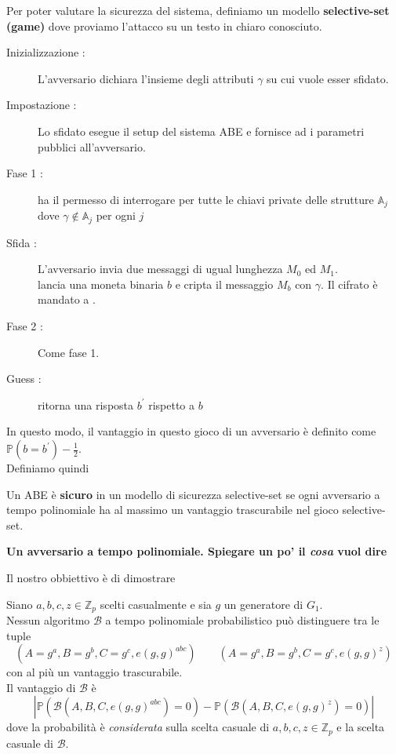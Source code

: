Per poter valutare la sicurezza del sistema, definiamo un modello \textbf{selective-set (game)} dove proviamo l'attacco su un testo in chiaro conosciuto.
\begin{description}
\item[Inizializzazione :] L'avversario  dichiara l'insieme degli attributi $\gamma$ su cui vuole esser sfidato.
\item[Impostazione :] Lo sfidato  esegue il setup del sistema ABE e fornisce ad  i parametri pubblici all'avversario.
\item[Fase 1 :]  ha il permesso di interrogare  per tutte le chiavi private delle strutture $\mathbb{A}_j$ dove $\gamma \notin \mathbb{A}_j$ per ogni $j$
\item[Sfida :] L'avversario  invia due messaggi di ugual lunghezza $M_0$ ed $M_1$.\\
 lancia una moneta binaria $b$ e cripta il messaggio $M_b$ con $\gamma$. Il cifrato è mandato a .
\item[Fase 2 :] Come fase 1.
\item[Guess :]  ritorna una risposta $b^\prime$ rispetto a $b$
\end{description}

In questo modo, il vantaggio in questo gioco di un avversario  è definito come $\mathbb{P}(b = b^\prime) - \frac{1}{2}$.\\[0.5cm]



Definiamo quindi
\begin{defi}
Un ABE è \textbf{sicuro} in un modello di sicurezza selective-set se ogni avversario a tempo polinomiale ha al massimo un vantaggio trascurabile nel gioco selective-set.
\end{defi}

\textbf{Un avversario a tempo polinomiale. Spiegare un po' il \emph{cosa} vuol dire}

Il nostro obbiettivo è di dimostrare
\begin{assu}
Siano $a,b,c,z \in \mathbb{Z}_p$ scelti casualmente e sia $g$ un generatore di $G_1$.\\
Nessun algoritmo $\mathcal{B}$ a tempo polinomiale probabilistico può distinguere tra le tuple
\[ (A = g^a , B = g^b , C = g^c , e(g,g)^{abc}) \qquad (A = g^a , B = g^b , C = g^c , e(g,g)^{z}) \]
con al più un vantaggio trascurabile.\\
Il vantaggio di $\mathcal{B}$ è
\[ \left\lvert \mathbb{P}\left( \mathcal{B}(A,B,C,e(g,g)^{abc}) = 0 \right) - \mathbb{P}\left( \mathcal{B}(A,B,C,e(g,g)^{z}) = 0 \right) \right\rvert \]
dove la probabilità è \emph{considerata} sulla scelta casuale di $a,b,c,z \in \mathbb{Z}_p$ e la scelta casuale di $\mathcal{B}$.
\end{assu}


